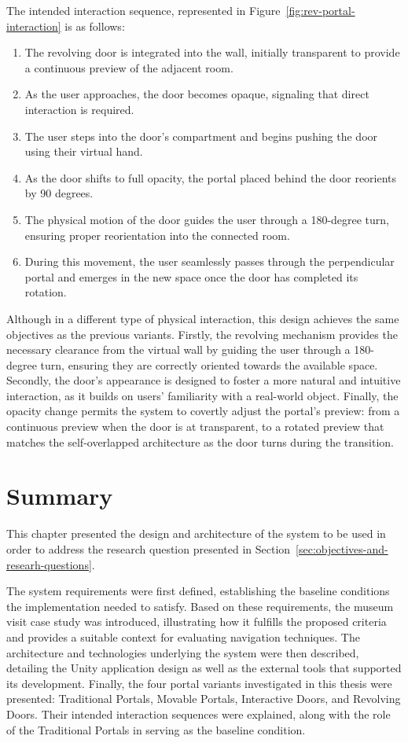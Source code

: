 The intended interaction sequence, represented in Figure~\ref{fig:rev-portal-interaction} is as follows:

\begin{enumerate}
  \item The revolving door is integrated into the wall, initially transparent to provide a continuous preview of the adjacent room.  
  \item As the user approaches, the door becomes opaque, signaling that direct interaction is required.  
  \item The user steps into the door's compartment and begins pushing the door using their virtual hand.  
  \item As the door shifts to full opacity, the portal placed behind the door reorients by 90 degrees.  
  \item The physical motion of the door guides the user through a 180-degree turn, ensuring proper reorientation into the connected room.  
  \item During this movement, the user seamlessly passes through the perpendicular portal and emerges in the new space once the door has 
  completed its rotation.  
\end{enumerate}

Although in a different type of physical interaction, this design achieves the same objectives as the previous variants. 
Firstly, the revolving mechanism provides the necessary clearance from the virtual wall by guiding the user 
through a 180-degree turn, ensuring they are correctly oriented towards the available space. Secondly, the door's appearance is designed to 
foster a more natural and intuitive interaction, as it builds on users' familiarity with a real-world object. 
Finally, the opacity change permits the system to covertly adjust the 
portal's preview: from a continuous preview when the door is at transparent, to a rotated preview 
that matches the self-overlapped architecture as the door turns during the transition.

\section{Summary}
\label{sec:chap3-summary}

This chapter presented the design and architecture of the system to be used in order to 
address the research question presented in Section~\ref{sec:objectives-and-researh-questions}.

The system requirements were first defined, establishing the baseline conditions the implementation needed to satisfy. Based on these requirements, the museum visit case study was introduced, illustrating how it fulfills the proposed criteria and provides a suitable context for evaluating navigation techniques.
The architecture and technologies underlying the system were then described, detailing the Unity application design as well as the external tools that supported its development.
Finally, the four portal variants investigated in this thesis were presented: Traditional Portals, Movable Portals, Interactive Doors, and Revolving Doors. Their intended interaction sequences were explained, along with the role of the Traditional Portals in serving as the baseline condition.